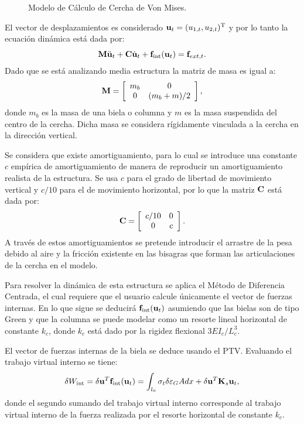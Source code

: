 \begin{figure}[htb]
	\centering
	\def\svgwidth{0.6\textwidth}

	\caption{Modelo de Cálculo de Cercha de Von Mises.}
	\label{fig:ModelVM}
\end{figure}

El vector de desplazamientos es considerado ${\bf u}_t = (u_{1,t}, u_{2,t})^\text{T}$ y por lo tanto la ecuación dinámica está dada por:
%
\begin{equation}
{\bf M} \ddot{{\bf u}}_t + {\bf C} \dot{{\bf u}}_t + {\bf f}_{\text{int}}({\bf u}_t)={\bf f}_{ext,t}.
\end{equation}	
%
Dado que se está analizando media estructura la matriz de masa es igual a:
%
$${\bf M} = \left[\begin{array}{cc}m_b& 0\\ 0& (m_b+m)/2\end{array}\right],$$
%
donde $m_b$ es la masa de una biela o columna y $m$ es la masa suspendida del centro de la cercha. Dicha masa se considera rígidamente vinculada a la cercha en la dirección vertical.

Se considera que existe amortiguamiento, para lo cual se introduce una constante $c$ empírica de amortiguamiento de manera de reproducir un amortiguamiento realista de la estructura. %
%
Se usa $c$ para el grado de libertad de movimiento vertical y $c/10$ para el de movimiento horizontal, por lo que la matriz ${\bf C}$ está dada por:
$${\bf C} = \left[\begin{array}{cc}c/10& 0\\ 0& c\end{array}\right].$$
%
A través de estos amortiguamientos se pretende introducir el arrastre de la pesa debido al aire y la fricción existente en las bisagras que forman las articulaciones de la cercha en el modelo.

Para resolver la dinámica de esta estructura se aplica el Método de Diferencia Centrada, el cual requiere que el usuario calcule únicamente el vector de fuerzas internas. %
%
En lo que sigue se deducirá ${\bf f}_{\text{int}}({\bf u}_t)$ asumiendo que las bielas son de tipo Green y que la columna se puede modelar como un resorte lineal horizontal de constante $k_c$,  donde $k_c$ está dado por la rigidez flexional $3 E I_c / L_c^3$.

El vector de fuerzas internas de la biela se deduce usando el PTV. Evaluando el trabajo virtual interno se tiene:
%
\begin{equation}
\delta W_{\text{int}}=\delta{\bf u}^T {\bf f}_{\text{int}}({\bf u}_t)= \int_{l_0} \sigma_t \delta\varepsilon_G A dx + \delta{\bf u}^T{\bf K}_s {\bf u}_t,
\end{equation}
%
donde el segundo sumando del trabajo virtual interno corresponde al trabajo virtual interno de la fuerza realizada por el resorte horizontal de constante $k_c$.

